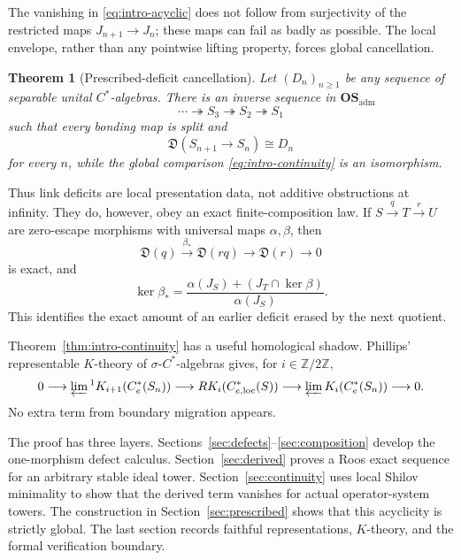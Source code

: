 \documentclass[11pt,a4paper]{amsart}
\theoremstyle{plain}
\newtheorem{theorem}{Theorem}[section]
\theoremstyle{definition}
\newcommand{\Ce}{C_e^*}
\newcommand{\Celoc}{C_{e,\mathrm{loc}}^*}
\newcommand{\OSadm}{\mathbf{OS}_{\mathrm{adm}}}
\newcommand{\Def}{\mathfrak D}
\begin{document}
The vanishing in \eqref{eq:intro-acyclic} does not follow from surjectivity of the restricted maps
$J_{n+1}\to J_n$; these maps can fail as badly as possible.  The local envelope, rather than any
pointwise lifting property, forces global cancellation.

\begin{theorem}[Prescribed-deficit cancellation]\label{thm:intro-prescribed}
Let $(D_n)_{n\geq1}$ be any sequence of separable unital $C^*$-algebras.  There is an inverse
sequence in $\OSadm$
\[
 \cdots\twoheadrightarrow S_3\twoheadrightarrow S_2\twoheadrightarrow S_1
\]
such that every bonding map is split and
\[
 \Def(S_{n+1}\to S_n)\cong D_n
\]
for every $n$, while the global comparison \eqref{eq:intro-continuity} is an isomorphism.
\end{theorem}

Thus link deficits are local presentation data, not additive obstructions at infinity.  They do,
however, obey an exact finite-composition law.  If
$S\xrightarrow{q}T\xrightarrow{r}U$ are zero-escape morphisms with universal maps
$\alpha,\beta$, then
\begin{equation}\label{eq:intro-composition}
 \Def(q)\xrightarrow{\beta_*}\Def(rq)\longrightarrow\Def(r)\longrightarrow0
\end{equation}
is exact, and
\[
 \ker\beta_*=\frac{\alpha(J_S)+(J_T\cap\ker\beta)}{\alpha(J_S)}.
\]
This identifies the exact amount of an earlier deficit erased by the next quotient.

Theorem~\ref{thm:intro-continuity} has a useful homological shadow.  Phillips' representable
$K$-theory of $\sigma$-$C^*$-algebras \cite{Phillips1989} gives, for
$i\in\mathbb Z/2\mathbb Z$,
\begin{equation}\label{eq:intro-K}
 0\longrightarrow\varprojlim{}^1K_{i+1}(\Ce(S_n))
 \longrightarrow RK_i(\Celoc(S))
 \longrightarrow\varprojlim K_i(\Ce(S_n))\longrightarrow0.
\end{equation}
No extra term from boundary migration appears.

The proof has three layers.  Sections~\ref{sec:defects}--\ref{sec:composition} develop the
one-morphism defect calculus.  Section~\ref{sec:derived} proves a Roos exact sequence for an
arbitrary stable ideal tower.  Section~\ref{sec:continuity} uses local Shilov minimality to show
that the derived term vanishes for actual operator-system towers.  The construction in
Section~\ref{sec:prescribed} shows that this acyclicity is strictly global.  The last section records
faithful representations, $K$-theory, and the formal verification boundary.
\end{document}
